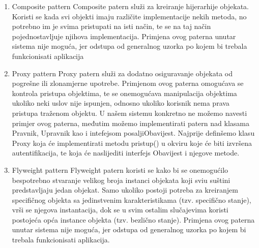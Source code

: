 \documentclass[12pt, a4paper]{report}
\theoremstyle{definition}
\begin{document}
\begin{enumerate}
     \item \large Composite pattern \newline
  \normalsize
  Composite patern služi za kreiranje hijerarhije objekata. Koristi se kada svi objekti imaju različite implementacije nekih metoda, no potrebno im je svima pristupati na isti način, te se na taj način pojednostavljuje njihova implementacija. Primjena  ovog  paterna  unutar  sistema nije moguća, jer odstupa od generalnog uzorka po kojem bi trebala funkcionisati aplikacija
     \item \large Proxy pattern \newline
  \normalsize
  Proxy patern služi za dodatno osiguravanje objekata od pogrešne ili zlonamjerne upotrebe. Primjenom  ovog  paterna  omogućava  se  kontrola  pristupa  objektima,  te  se  onemogućava manipulacija objektima ukoliko neki uslov nije ispunjen, odnosno ukoliko korisnik nema prava pristupa traženom objektu. U našem sistemu konkretno ne možemo navesti primjer ovog paterna,  međutim  možemo  implementirati  patern  nad  klasama Pravnik, Upravnik kao  i intefejsom posaljiObavijest.  Najprije definšemo klasu Proxy koja će implementirati metodu pristup() u okviru koje će biti izvršena autentifikacija, te koja će naslijediti interfejs Obavijest i njegove metode. 
   \item \large Flyweight pattern \newline
  \normalsize
  Flyweight patern  koristi  se  kako  bi  se  onemogućilo  bespotrebno  stvaranje  velikog  broja instanci objekata koji sviu suštini predstavljaju jedan objekat. Samo ukoliko postoji potreba za kreiranjem specifičnog objekta sa jedinstvenim karakteristikama (tzv. specifično stanje), vrši se njegova instantacija, dok se u svim ostalim slučajevima koristi postojeća opća instance objekta (tzv. bezlično stanje). Primjena ovog paterna unutar sistema nije moguća, jer odstupa od generalnog uzorka po kojem bi trebala funkcionisati aplikacija.
\end{enumerate}
\end{document}
